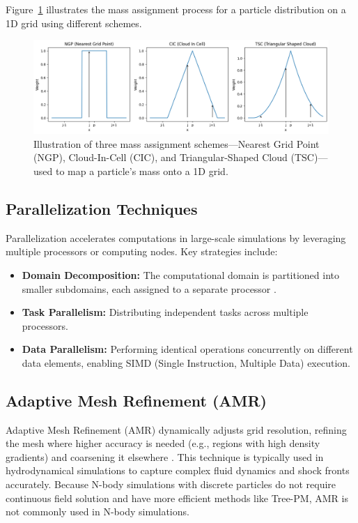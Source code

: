 Figure~\ref{fig:mass-assignment} illustrates the mass assignment process for a particle distribution on a 1D grid using different schemes.
\begin{figure}[ht]
    \centering
    \includegraphics[width=\textwidth]{figures/weight_functions.png}
    \caption[Illustration of three mass assignment schemes]{Illustration of three mass assignment schemes—Nearest Grid Point (NGP), Cloud-In-Cell (CIC), and Triangular-Shaped Cloud (TSC)—used to map a particle's mass onto a 1D grid.}
    \label{fig:mass-assignment}
\end{figure}

\subsection{Parallelization Techniques}
Parallelization accelerates computations in large-scale simulations by leveraging multiple processors or computing nodes. Key strategies include:
\begin{itemize}
    \item \textbf{Domain Decomposition:} The computational domain is partitioned into smaller subdomains, each assigned to a separate processor \citep{1986Natur.324..446B}.
    \item \textbf{Task Parallelism:} Distributing independent tasks across multiple processors.
    \item \textbf{Data Parallelism:} Performing identical operations concurrently on different data elements, enabling SIMD (Single Instruction, Multiple Data) execution.
\end{itemize}

\subsection{Adaptive Mesh Refinement (AMR)}
Adaptive Mesh Refinement (AMR) dynamically adjusts grid resolution, refining the mesh where higher accuracy is needed (e.g., regions with high density gradients) and coarsening it elsewhere \citep{1989JCoPh..82...64B}. This technique is typically used in hydrodynamical simulations to capture complex fluid dynamics and shock fronts accurately.
Because N-body simulations with discrete particles do not require continuous field solution and have more efficient methods like Tree-PM, AMR is not commonly used in N-body simulations.

